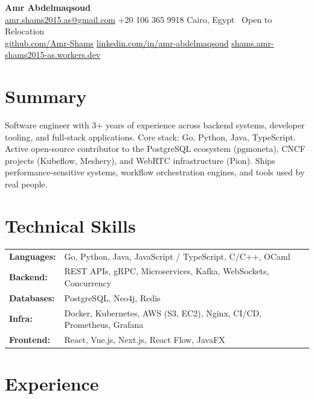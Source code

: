 \documentclass[a4paper,10pt]{article}
\newcommand{\skillrow}[2]{%
    \textbf{#1:} & #2 \\[0.3mm]%
}
\newcommand{\bodysize}{\fontsize{7.3}{9.2}\selectfont}
\begin{document}
\bodysize
\color{dark}

\begin{center}
    {\fontsize{16}{18}\selectfont\bfseries\color{black} Amr Abdelmaqsoud}\\[0.5mm]
    {\fontsize{7.5}{9.5}\selectfont\color{grey}
        \href{mailto:amr.shams2015.as@gmail.com}{amr.shams2015.as@gmail.com}
        \enspace\textbullet\enspace +20 106 365 9918
        \enspace\textbullet\enspace Cairo, Egypt \textbullet\ Open to Relocation
    }\\[0.8mm]
    {\fontsize{7.5}{9.5}\selectfont\color{linkblue}
        \href{https://github.com/Amr-Shams}{github.com/Amr-Shams}
        \enspace\textbullet\enspace
        \href{https://linkedin.com/in/amr-abdelmaqsoud-b5107519b}{linkedin.com/in/amr-abdelmaqsoud}
        \enspace\textbullet\enspace
        \href{https://shams.amr-shams2015-as.workers.dev}{shams.amr-shams2015-as.workers.dev}
    }
\end{center}

\section{Summary}
Software engineer with 3+ years of experience across backend systems, developer tooling,
and full-stack applications. Core stack: Go, Python, Java, TypeScript. Active open-source
contributor to the PostgreSQL ecosystem (pgmoneta), CNCF projects (Kubeflow, Meshery),
and WebRTC infrastructure (Pion). Ships performance-sensitive systems, workflow
orchestration engines, and tools used by real people.

\section{Technical Skills}
\begin{tabularx}{\textwidth}{@{} l X @{}}
    \skillrow{Languages}{Go, Python, Java, JavaScript / TypeScript, C/C++, OCaml}
    \skillrow{Backend}{REST APIs, gRPC, Microservices, Kafka, WebSockets, Concurrency}
    \skillrow{Databases}{PostgreSQL, Neo4j, Redis}
    \skillrow{Infra}{Docker, Kubernetes, AWS (S3, EC2), Nginx, CI/CD, Prometheus, Grafana}
    \skillrow{Frontend}{React, Vue.js, Next.js, React Flow, JavaFX}
\end{tabularx}

\section{Experience}
\end{document}
